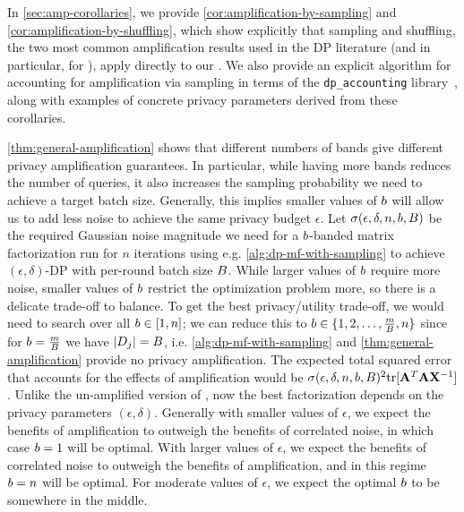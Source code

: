 \documentclass{article}
\begin{document}
 In \cref{sec:amp-corollaries}, we provide \cref{cor:amplification-by-sampling} and \cref{cor:amplification-by-shuffling}, which show explicitly that sampling and shuffling, the two most common amplification results used in the DP literature (and in particular, for \dpsgd), apply directly to our \BANDMF. We also provide an explicit algorithm for accounting for amplification via sampling in terms of the
\texttt{dp\_accounting} library~\citep{pldlib}, along with examples of concrete privacy parameters derived from these corollaries.


\cref{thm:general-amplification} shows that different numbers of bands give different privacy amplification guarantees. In particular, while having more bands reduces the number of queries, it also increases the sampling probability we need to achieve a target batch size. Generally, this implies smaller values of $b$ will allow us to add less noise to achieve the same privacy budget $\epsilon$. Let $\sigma(\epsilon, \delta, n, b, B)$ be the required Gaussian noise magnitude we need for a $b$-banded matrix factorization run for $n$ iterations using e.g. \cref{alg:dp-mf-with-sampling} to achieve $(\epsilon, \delta)$-DP with per-round batch size $B$. While larger values of $b$ require more noise, smaller values of $b$ restrict the optimization problem more, so there is a delicate trade-off to balance. To get the best privacy/utility trade-off, we would need to search over all $b \in [1, n]$; we can reduce this to $b \in \{1, 2, \dots, \frac{m}{B}, n \}$ since for $b = \frac{m}{B}$ we have $|D_j| = B$, i.e. \cref{alg:dp-mf-with-sampling} and \cref{thm:general-amplification} provide no privacy amplification.  The expected total squared error that accounts for the effects of amplification would be $\sigma(\epsilon, \delta, n, b, B)^2 \mathrm{tr}{[\mathbf{A}^T \mathbf{A} \mathbf{X}^{-1}]}$. Unlike the un-amplified version of \MF, now the best factorization depends on the privacy parameters $(\epsilon, \delta)$.  Generally with smaller values of $\epsilon$, we expect the benefits of amplification to outweigh the benefits of correlated noise, in which case $b=1$ will be optimal. With larger values of $\epsilon$, we expect the benefits of correlated noise to outweigh the benefits of amplification, and in this regime $b=n$ will be optimal. For moderate values of $\epsilon$, we expect the optimal $b$ to be somewhere in the middle.
\end{document}
